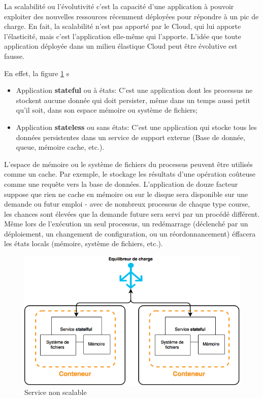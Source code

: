 \begin{onehalfspace}
La scalabilité ou l'évolutivité c'est la capacité d'une application à pouvoir exploiter des nouvelles ressources récemment déployées pour répondre à un pic de charge. En fait, la scalabilité n'est pas apporté par le Cloud, qui lui apporte l'élasticité, mais c'est l'application elle-même qui l'apporte. L'idée que toute application déployée dans un milieu élastique Cloud peut être évolutive est fausse.


En effet, la figure \ref{fig:non-scalable} 
s
\begin{itemize}
	\item Application \textbf{stateful} ou à états: C'est une application dont les processus ne stockent aucune donnée qui doit persister, même dans un temps aussi petit qu'il soit, dans son espace mémoire ou système de fichiers;
	\item Application \textbf{stateless} ou sans états: C'est une application qui stocke tous les données persistentes dans un service de support externe (Base de donnée, queue, mémoire cache, etc.).
\end{itemize}

L'espace de mémoire ou le système de fichiers du processus peuvent être utilisés comme un cache. Par exemple, le stockage les résultats d'une opération coûteuse comme une requête vers la base de données. L'application de douze facteur suppose que rien ne cache en mémoire ou sur le disque sera disponible sur une demande ou futur emploi - avec de nombreux processus de chaque type course, les chances sont élevées que la demande future sera servi par un procédé différent. Même lors de l'exécution un seul processus, un redémarrage (déclenché par un déploiement, un changement de configuration, ou un réordonnancement) éffacera les états locals (mémoire, système de fichiers, etc.).

\begin{figure}[H]
\centering
\includegraphics [scale=0.5]{chapitre4/assets/stateful}
\caption{Service non scalable}
\label{fig:non-scalable}
\end{figure}


\end{onehalfspace}
